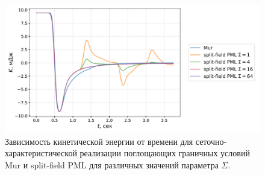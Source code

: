 \begin{figure}[H]
    \centering
    \includegraphics[width=1.0\textwidth]{images/pml/gcm_split-field.png}
    \caption{Зависимость кинетической энергии от времени для сеточно-характеристической реализации поглощающих граничных условий Mur и split-field PML для различных значений параметра $\Sigma$.}
    \label{fig:gcm_split_field_pml}
\end{figure}


